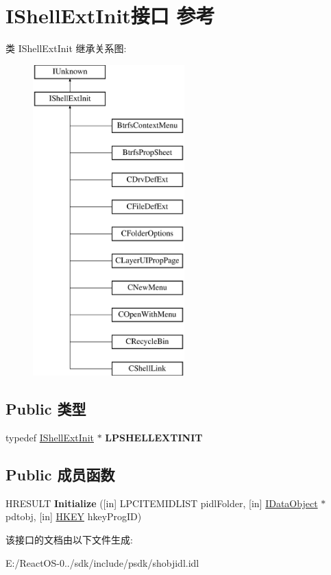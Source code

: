 \hypertarget{interface_i_shell_ext_init}{}\section{I\+Shell\+Ext\+Init接口 参考}
\label{interface_i_shell_ext_init}
类 I\+Shell\+Ext\+Init 继承关系图\+:\begin{figure}[H]
\begin{center}
\leavevmode
\includegraphics[height=12.000000cm]{interface_i_shell_ext_init}
\end{center}
\end{figure}
\subsection*{Public 类型}
\begin{DoxyCompactItemize}
\item 
\mbox{\label{interface_i_shell_ext_init_ae162503aaa157965eaafdc7658649117}} 
typedef \hyperlink{interface_i_shell_ext_init}{I\+Shell\+Ext\+Init} $\ast$ {\bfseries L\+P\+S\+H\+E\+L\+L\+E\+X\+T\+I\+N\+IT}
\end{DoxyCompactItemize}
\subsection*{Public 成员函数}
\begin{DoxyCompactItemize}
\item 
\mbox{\label{interface_i_shell_ext_init_ac7abbef507834c99114a6c6052446c9f}} 
H\+R\+E\+S\+U\+LT {\bfseries Initialize} (\mbox{[}in\mbox{]} L\+P\+C\+I\+T\+E\+M\+I\+D\+L\+I\+ST pidl\+Folder, \mbox{[}in\mbox{]} \hyperlink{interface_i_data_object}{I\+Data\+Object} $\ast$pdtobj, \mbox{[}in\mbox{]} \hyperlink{interfacevoid}{H\+K\+EY} hkey\+Prog\+ID)
\end{DoxyCompactItemize}


该接口的文档由以下文件生成\+:\begin{DoxyCompactItemize}
\item 
E\+:/\+React\+O\+S-\/0../sdk/include/psdk/shobjidl.\+idl\end{DoxyCompactItemize}
